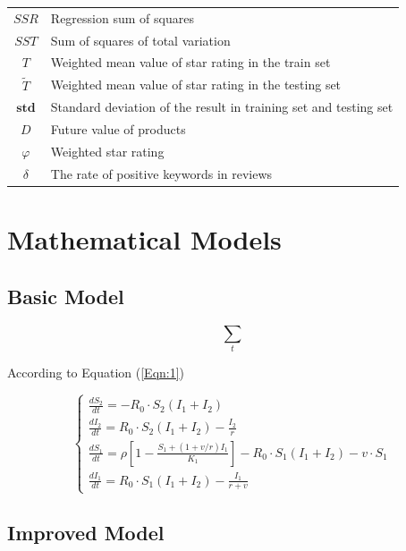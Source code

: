 \documentclass[12pt,a4paper]{article}
\begin{document}
\begin{spacing}{1.2}
\begin{table}[h]
\begin{center}
{\begin{tabular}{c l}
$SSR$ & {Regression sum of squares} \\
$SST$ & {Sum of squares of total variation} \\
$T$   & {Weighted mean value of star rating in the train set}\\
$\widetilde{T}$  & {Weighted mean value of star rating in the testing set}\\
$\textbf{std}$  &  {Standard deviation of the result in training set and testing set}\\
$D$ & {Future value of products} \\
$\varphi$ & {Weighted star rating} \\
$\delta$ & {The rate of positive keywords in reviews} \\
\bottomrule
\end{tabular}}
\end{center}
\end{table}



\section{Mathematical Models}
\label{MathModels}


\subsection{Basic Model}

\begin{equation}
\sum\limits_t
\label{Eqn:1}
\end{equation}

According to Equation (\ref{Eqn:1})

\begin{equation}
\left\{ {\begin{array}{*{20}{l}}
{\frac{{d{S_2}}}{{dt}} =  - {R_0} \cdot {S_2}({I_1} + {I_2})}\\
{\frac{{d{I_2}}}{{dt}} = {R_0} \cdot {S_2}({I_1} + {I_2}) - \frac{{{I_2}}}{r}}\\
{\frac{{d{S_1}}}{{dt}} = \rho \left[ {1 - \frac{{{S_1} + (1 + v/r){I_1}}}{{{K_1}}}} \right] - {R_0} \cdot {S_1}({I_1} + {I_2}) - v \cdot {S_1}}\\
{\frac{{d{I_1}}}{{dt}} = {R_0} \cdot {S_1}({I_1} + {I_2}) - \frac{{{I_1}}}{{r + v}}}
\end{array}} \right.
\end{equation}

\subsection{Improved Model}


\end{spacing}
\end{document}
